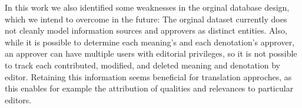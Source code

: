 \documentclass[sw]{iosart2c}
\newcommand*{\origtodo}{}
\let\origtodo\todo
\renewcommand*{\todo}{\origtodo[inline]}
\begin{document}
In this work we also identified some weaknesses in
the orginal database design,
which we intend to overcome in the future:
The orginal dataset currently does not cleanly model information sources and approvers
as distinct entities.
Also, while it is possible to determine each meaning's and each denotation's approver, an approver can have multiple users with editorial privileges, so it is not possible to track each contributed, modified, and deleted meaning and denotation by editor.
Retaining this information seems beneficial for translation approches,
as this enables for example the attribution of qualities and relevances to particular editors.




\end{document}
